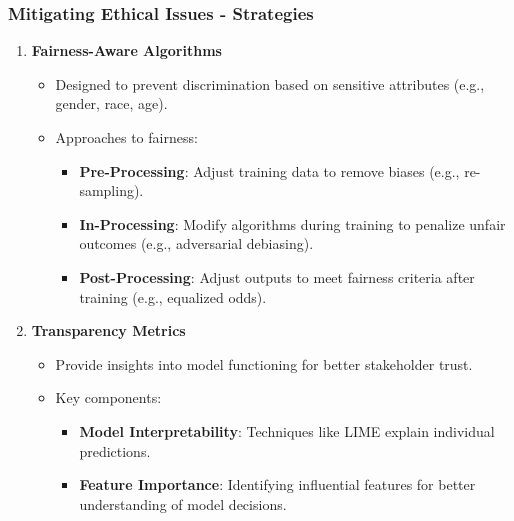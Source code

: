 \documentclass[aspectratio=169]{beamer}
\begin{document}
\begin{frame}[fragile]
    \frametitle{Mitigating Ethical Issues - Strategies}
    \begin{enumerate}
        \item \textbf{Fairness-Aware Algorithms}
            \begin{itemize}
                \item Designed to prevent discrimination based on sensitive attributes (e.g., gender, race, age).
                \item Approaches to fairness:
                \begin{itemize}
                    \item \textbf{Pre-Processing}: Adjust training data to remove biases (e.g., re-sampling).
                    \item \textbf{In-Processing}: Modify algorithms during training to penalize unfair outcomes (e.g., adversarial debiasing).
                    \item \textbf{Post-Processing}: Adjust outputs to meet fairness criteria after training (e.g., equalized odds).
                \end{itemize}
            \end{itemize}
        
        \item \textbf{Transparency Metrics}
            \begin{itemize}
                \item Provide insights into model functioning for better stakeholder trust.
                \item Key components:
                \begin{itemize}
                    \item \textbf{Model Interpretability}: Techniques like LIME explain individual predictions.
                    \item \textbf{Feature Importance}: Identifying influential features for better understanding of model decisions.
                \end{itemize}
            \end{itemize}
    \end{enumerate}
\end{frame}
\end{document}
